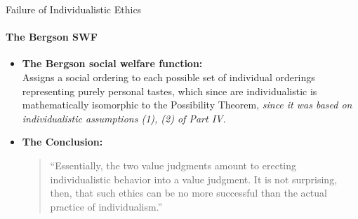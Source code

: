 \documentclass{beamer}
\begin{document}
\begin{frame}{Failure of Individualistic Ethics}
    \framesubtitle{The Bergson SWF}

    \begin{itemize}
        \item \textbf{The Bergson social welfare function:} \\
        Assigns a social ordering to each possible set of individual orderings representing purely personal tastes, which since are individualistic is mathematically isomorphic to the Possibility Theorem, \textit{since it was based on individualistic assumptions (1), (2) of Part IV.}
        \vspace{0.5 cm}
        \item \textbf{The Conclusion:}
        \begin{quote}
            ``Essentially, the two value judgments amount to erecting individualistic behavior into a value judgment. It is not surprising, then, that such ethics can be no more successful than the actual practice of individualism.''
        \end{quote}
    \end{itemize}
\end{frame}
\end{document}
